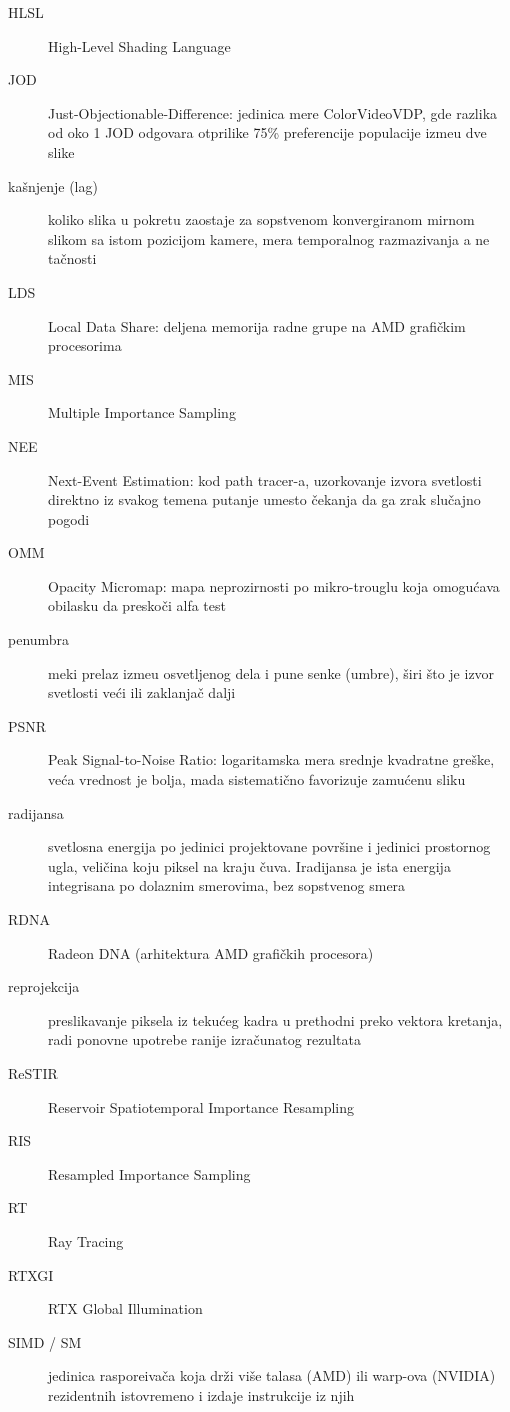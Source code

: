 \begin{description}
  \item[HLSL] High-Level Shading Language
  \item[JOD] Just-Objectionable-Difference: jedinica mere ColorVideoVDP, gde razlika od oko 1 JOD
    odgovara otprilike 75\% preferencije populacije izme\dj u dve slike
  \item[ka\v{s}njenje (lag)] koliko slika u pokretu zaostaje za sopstvenom konvergiranom mirnom slikom
    sa istom pozicijom kamere, mera temporalnog razmazivanja a ne ta\v{c}nosti
  \item[LDS] Local Data Share: deljena memorija radne grupe na AMD grafi\v{c}kim procesorima
  \item[MIS] Multiple Importance Sampling
  \item[NEE] Next-Event Estimation: kod path tracer-a, uzorkovanje izvora svetlosti direktno iz
    svakog temena putanje umesto \v{c}ekanja da ga zrak slu\v{c}ajno pogodi
  \item[OMM] Opacity Micromap: mapa neprozirnosti po mikro-trouglu koja omogu\'cava obilasku da
    presko\v{c}i alfa test
  \item[penumbra] meki prelaz izme\dj u osvetljenog dela i pune senke (umbre), \v{s}iri \v{s}to je
    izvor svetlosti ve\'ci ili zaklanja\v{c} dalji
  \item[PSNR] Peak Signal-to-Noise Ratio: logaritamska mera srednje kvadratne gre\v{s}ke, ve\'ca
    vrednost je bolja, mada sistemati\v{c}no favorizuje zamu\'cenu sliku
  \item[radijansa] svetlosna energija po jedinici projektovane povr\v{s}ine i jedinici prostornog
    ugla, veli\v{c}ina koju piksel na kraju \v{c}uva. Iradijansa je ista energija integrisana po
    dolaznim smerovima, bez sopstvenog smera
  \item[RDNA] Radeon DNA (arhitektura AMD grafi\v{c}kih procesora)
  \item[reprojekcija] preslikavanje piksela iz teku\'ceg kadra u prethodni preko vektora kretanja,
    radi ponovne upotrebe ranije izra\v{c}unatog rezultata
  \item[ReSTIR] Reservoir Spatiotemporal Importance Resampling
  \item[RIS] Resampled Importance Sampling
  \item[RT] Ray Tracing
  \item[RTXGI] RTX Global Illumination
  \item[SIMD / SM] jedinica raspore\dj iva\v{c}a koja dr\v{z}i vi\v{s}e talasa (AMD) ili warp-ova
    (NVIDIA) rezidentnih istovremeno i izdaje instrukcije iz njih

\end{description}
